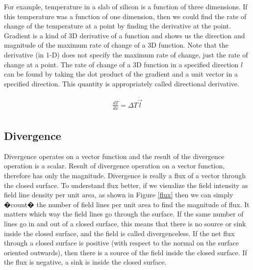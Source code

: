 For example, temperature in a slab of silicon is a function of three dimensions. If this temperature was a function of one dimension, then we could find the rate of change of the temperature at a point by finding the derivative at the point. Gradient is a kind of 3D derivative of a function and shows us the direction and magnitude of the  maximum rate of change of a 3D function. Note that the derivative (in 1-D) does not specify the maximum rate of change, just the rate of change at a point.  The rate of change of a 3D function in  a specified direction $l$ can be found by taking the dot product of the gradient and a unit vector in a specified direction. This quantity is appropriately called directional derivative.


\begin{eqnarray}
\frac{ dT}{dx} = \Delta T \dot \vec{l} \\ \nonumber
\end{eqnarray}











\subsection{Divergence}

Divergence operates on a vector function and the result of the divergence operation is a scalar. Result of divergence operation on  a vector function, therefore has only the magnitude. Divergence is really a flux of a vector through the closed surface. To understand flux better,  if we visualize the field intensity as field line density per unit area, as shown in Figure \ref{flux} then we can simply �count� the number of field lines per unit area to find the magnitude  of flux. It matters which way the field lines go through the surface. If the  same number of lines go in and out of a closed surface, this means that there is no source or sink inside the closed surface, and the field is called divergenceless. If the net flux through a closed surface is positive (with respect to the normal on the surface oriented outwards), then there is a source of the field inside the closed surface. If the flux is negative, a sink is inside the closed surface.


